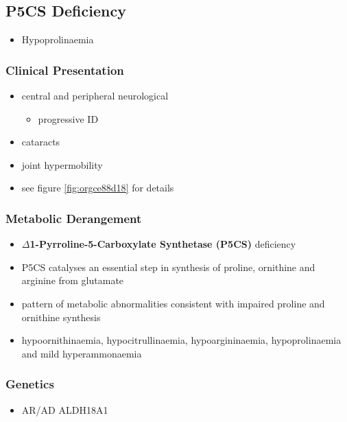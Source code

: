 \documentclass[12pt]{scrartcl}
\begin{document}
\begin{center}
\begin{center}
\subsection{P5CS  Deficiency}
\label{sec:org52c62d1}
\begin{itemize}
\item Hypoprolinaemia
\end{itemize}
\subsubsection{Clinical Presentation}
\label{sec:orgcf0e80d}
\begin{itemize}
\item central and peripheral neurological
\begin{itemize}
\item progressive ID
\end{itemize}
\item cataracts
\item joint hypermobility
\item see figure \ref{fig:orgce88d18} for details
\end{itemize}

\subsubsection{Metabolic Derangement}
\label{sec:org807688d}
\begin{itemize}
\item \textbf{\(\Delta\)1-Pyrroline-5-Carboxylate Synthetase (P5CS)} deficiency
\item P5CS catalyses an essential step in synthesis of proline, ornithine
and arginine from glutamate
\end{itemize}


\begin{itemize}
\item pattern of metabolic abnormalities consistent with impaired proline
and ornithine synthesis
\item hypoornithinaemia, hypocitrullinaemia, hypoargininaemia,
hypoprolinaemia and mild hyperammonaemia
\end{itemize}

\subsubsection{Genetics}
\label{sec:org52f8d1f}
\begin{itemize}
\item AR/AD ALDH18A1
\end{itemize}


\end{center}
\end{center}
\end{document}
